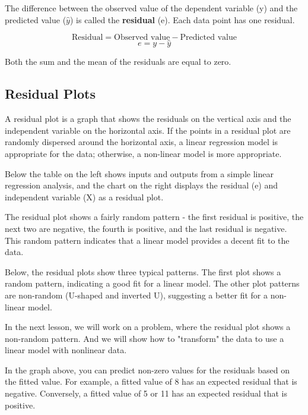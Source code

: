 \documentclass[12pt, a4paper]{article}
\theoremstyle{plain}
\theoremstyle{definition}
\theoremstyle{remark}
\begin{document}
The difference between the observed value of the dependent variable (y) and the predicted value ($\hat{y}$) is called the \textbf{residual} (e). Each data point has one residual.

\[\mbox{Residual} = \mbox{Observed value} - \mbox{Predicted value}\] 
\[e = y - \hat{y}\]

Both the sum and the mean of the residuals are equal to zero. 

\subsection{Residual Plots}
A residual plot is a graph that shows the residuals on the vertical axis and the independent variable on the horizontal axis. If the points in a residual plot are randomly dispersed around the horizontal axis, a linear regression model is appropriate for the data; otherwise, a non-linear model is more appropriate.

Below the table on the left shows inputs and outputs from a simple linear regression analysis, and the chart on the right displays the residual (e) and independent variable (X) as a residual plot.

\newpage
The residual plot shows a fairly random pattern - the first residual is positive, the next two are negative, the fourth is positive, and the last residual is negative. This random pattern indicates that a linear model provides a decent fit to the data.

Below, the residual plots show three typical patterns. The first plot shows a random pattern, indicating a good fit for a linear model. The other plot patterns are non-random (U-shaped and inverted U), suggesting a better fit for a non-linear model.

		
In the next lesson, we will work on a problem, where the residual plot shows a non-random pattern. And we will show how to "transform" the data to use a linear model with nonlinear data.

\newpage
In the graph above, you can predict non-zero values for the residuals based on the fitted value. For example, a fitted value of 8 has an expected residual that is negative. Conversely, a fitted value of 5 or 11 has an expected residual that is positive.
\end{document}
